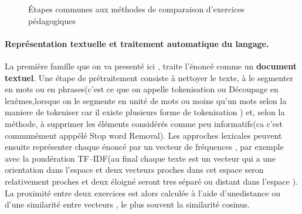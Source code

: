 \documentclass[12pt,a4paper,oneside]{report}
\begin{document}

\begin{figure}[H]
    \centering
    \caption{Étapes communes aux méthodes de comparaison d'exercices pédagogiques}
    \label{fig:pipeline_generique}
\end{figure}

\paragraph{Représentation textuelle et traitement automatique du langage.}

La première famille que on va presenté ici , traite l'énoncé comme un 
\textbf{document textuel}. Une étape de prétraitement consiste à nettoyer le texte, à le segmenter en mots ou en
phrases(c'est ce que on appelle tokenisation ou Découpage en lexèmes,lorsque on le segmente en unité 
 de mots ou moins qu'un mots selon la maniere de tokeniser car il existe plusieurs forme de tokenisation ) et, selon la méthode, à supprimer les éléments considérés comme peu
informatifs(ca c'est communément apppélé Stop word Removal). Les approches lexicales peuvent ensuite représenter chaque
énoncé par un vecteur de fréquences , par exemple avec la pondération
TF--IDF(au final chaque texte est un vecteur qui a une orientation dans l'espace 
et deux vecteurs proches dans cet espace seron relativement proches et deux éloigné 
 seront tres séparé ou distant dans l'espace ). La proximité entre deux exercices 
 est alors calculée à l'aide d'unedistance ou d'une similarité entre vecteurs , 
 le plus souvent la similarité
cosinus.
\end{document}
